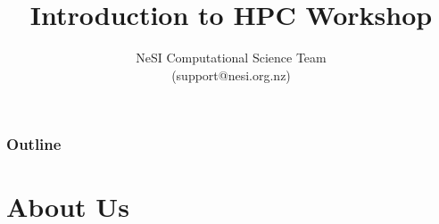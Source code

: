 \documentclass{beamer}
\title{Introduction to HPC Workshop}
\author{NeSI Computational Science Team \\(support@nesi.org.nz)}
\date{}
\newcommand\BackgroundPicture[1]{%
\setbeamertemplate{background}{%
\parbox[c][\paperheight]{\paperwidth}{%
\vfill \hfill \texttt{[image: \#1]}
\hfill \vfill
}}}
\begin{document}
{
\begin{frame}[plain]
\vspace{1cm}
\titlepage
\end{frame}
}


\begin{frame}
\frametitle{Outline}
\begin{multicols}{2}
   \tableofcontents
 \end{multicols}
 \end{frame}



\section{About Us}
\end{document}
